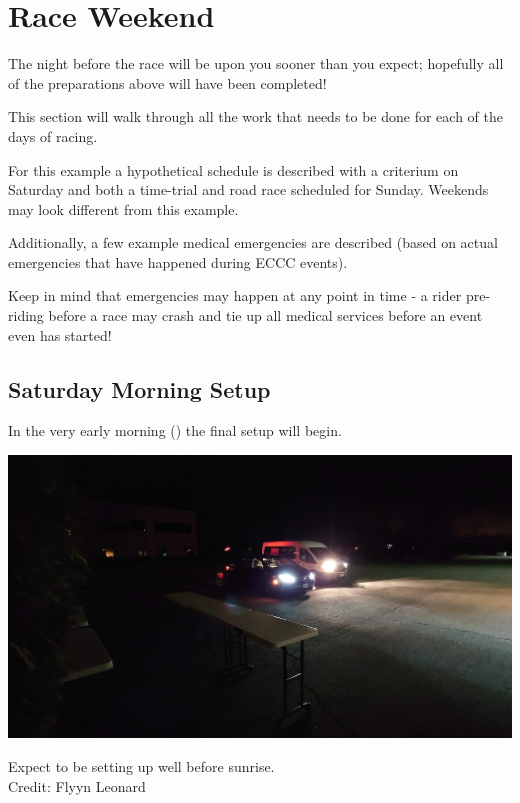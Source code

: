 \documentclass[
  letterpaper, %
  fontsize=10pt, %
  twoside=true,
  chapterentrydots=true, %
  numbers=noenddot,
  fontmethod=tex,
]{kaobook}
\begin{document}

\section{Race Weekend}

The night before the race will be upon you sooner than you expect;
hopefully all of the preparations above will have been completed!

This section will walk through all the work that needs to be done for each of the days of racing.

For this example a hypothetical schedule is described with a criterium on Saturday and both a time-trial and road race scheduled for Sunday.
Weekends may look different from this example.

Additionally, a few example medical emergencies are described
(based on actual emergencies that have happened during ECCC events).

Keep in mind that emergencies may happen at any point in time -
a rider pre-riding before a race may crash and tie up all medical services before an event even has started!


\subsection{Saturday Morning Setup}

In the very early morning ()
the final setup will begin.

\begin{marginfigure}[-10pt]
\includegraphics{2022_umass_early_am.jpg}
\caption[Early morning race setup]{Expect to be setting up well before sunrise.\\
          Credit: Flyyn Leonard}
\end{marginfigure}
\end{document}
